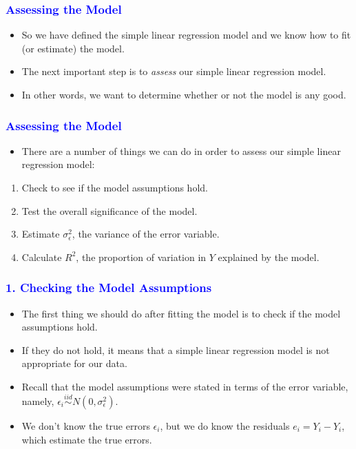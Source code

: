 \documentclass[12pt]{beamer}
\begin{document}
\begin{frame}
	\frametitle{\textcolor{blue}{Assessing the Model}}
	
	\begin{itemize}[label={\color{blue}$\blacktriangleright$}]
		\item So we have defined the simple linear regression model and we know how to fit (or estimate) the model.
		
		\item The next important step is to \textit{assess} our simple linear regression model.
		
		\item In other words, we want to determine whether or not the model is any good.
	\end{itemize}
	
\end{frame}
\begin{frame}
	\frametitle{\textcolor{blue}{Assessing the Model}}
	
	\begin{itemize}[label={\color{blue}$\blacktriangleright$}]
		\item There are a number of things we can do in order to assess our simple linear regression model:
	\end{itemize}
	
	\begin{enumerate}[label={\color{blue}\arabic{enumi}}.]
		\item Check to see if the model assumptions hold.
		\item Test the overall significance of the model.
		\item Estimate $\sigma_\epsilon^2$, the variance of the error variable.
		\item Calculate $R^2$, the proportion of variation in $Y$ explained by the model.
	\end{enumerate}
	
\end{frame}
\begin{frame}
	\frametitle{\textcolor{blue}{1. Checking the Model Assumptions}}
	
	\begin{itemize}[label={\color{blue}$\blacktriangleright$}]
		\item The first thing we should do after fitting the model is to check if the model assumptions hold.
		
		\item If they do not hold, it means that a simple linear regression model is not appropriate for our data.
		
		\item Recall that the model assumptions were stated in terms of the error variable, namely, $\epsilon_i \stackrel{iid}{\sim} N(0, \sigma_\epsilon^2)$.
		
		\item We don't know the true errors $\epsilon_i$, but we do know the residuals $e_i = Y_i - \hat{Y}_i$, which estimate the true errors.
	\end{itemize}
	
\end{frame}
\end{document}
